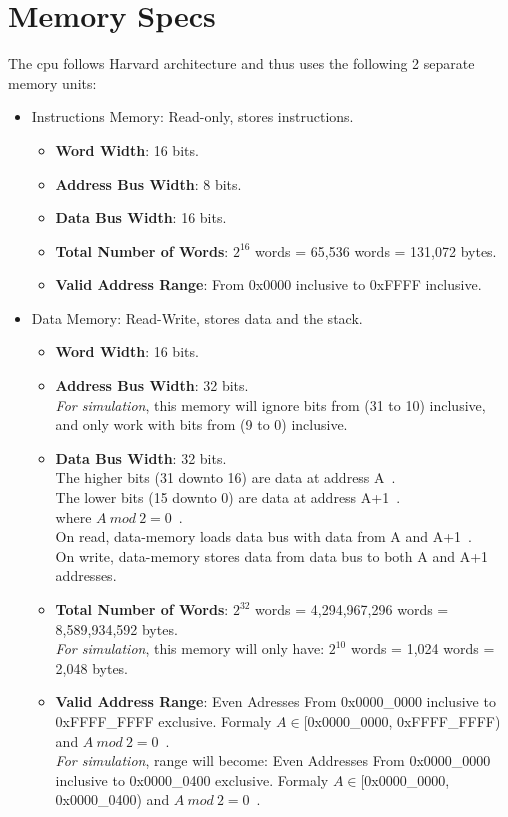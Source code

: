 \section{Memory Specs}
The cpu follows Harvard architecture and thus uses the following 2 separate memory units:
\begin{itemize}
    \item Instructions Memory: Read-only, stores instructions.
    \begin{itemize}
        \item \textbf{Word Width}: 16 bits.
        \item \textbf{Address Bus Width}: 8 bits.
        \item \textbf{Data Bus Width}: 16 bits.
        \item \textbf{Total Number of Words}: $2^{16}$ words = 65,536 words = 131,072 bytes.
        \item \textbf{Valid Address Range}: From 0x0000 inclusive to 0xFFFF inclusive.
    \end{itemize}
    \item Data Memory: Read-Write, stores data and the stack.
    \begin{itemize}
        \item \textbf{Word Width}: 16 bits.
        \item \textbf{Address Bus Width}: 32 bits.\\
        \textit{For simulation}, this memory will ignore bits from (31 to 10) inclusive, and only work with bits from (9 to 0) inclusive.
        \item \textbf{Data Bus Width}: 32 bits.\\
        The higher bits (31 downto 16) are data at address A~.\\
        The lower bits (15 downto 0) are data at address A+1~.\\
        where $A ~mod~ 2 = 0$~.\\
        On read, data-memory loads data bus with data from A and A+1~.\\
        On write, data-memory stores data from data bus to both A and A+1 addresses.
        \item \textbf{Total Number of Words}: $2^{32}$ words = 4,294,967,296 words = 8,589,934,592 bytes.\\
        \textit{For simulation}, this memory will only have: $2^{10}$ words = 1,024 words = 2,048 bytes.
        \item \textbf{Valid Address Range}: Even Adresses From 0x0000\_0000 inclusive to 0xFFFF\_FFFF exclusive. Formaly $A \in $[0x0000\_0000, 0xFFFF\_FFFF) and $A ~mod~ 2 = 0$~.\\
        \textit{For simulation}, range will become: Even Addresses From 0x0000\_0000 inclusive to 0x0000\_0400 exclusive. Formaly $A \in $[0x0000\_0000, 0x0000\_0400) and $A ~mod~ 2 = 0$~.
    \end{itemize}
\end{itemize}

